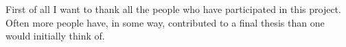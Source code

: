 

First of all I want to thank all the people who have participated in this
project. Often more people have, in some way, contributed to a final thesis
than one would initially think of.
